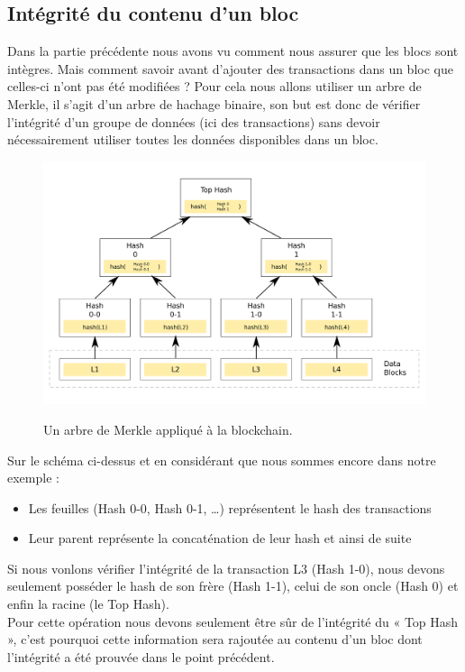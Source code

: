 \documentclass[12pt, a4paper, oneside]{book}
\begin{document}
    \subsection{Intégrité du contenu d’un bloc}

    Dans la partie précédente nous avons vu comment nous assurer que les blocs sont intègres. Mais comment savoir avant d’ajouter des transactions dans un bloc que celles-ci n’ont pas été modifiées ?
    \newline
    Pour cela nous allons utiliser un arbre de Merkle, il s’agit d’un arbre de hachage binaire, son but est donc de vérifier l’intégrité d’un groupe de données (ici des transactions) sans devoir nécessairement utiliser toutes les données disponibles dans un bloc.

    \begin{figure}[H]
        \begin{center}
          \includegraphics[width=\textwidth]{images/arbre.png}
          \label{fig:arbre}
          \caption{Un arbre de Merkle appliqué à la blockchain.}
        \end{center}
    \end{figure}

    Sur le schéma ci-dessus et en considérant que nous sommes encore dans notre exemple :

    \begin{itemize}
        \item Les feuilles (Hash 0-0, Hash 0-1, …) représentent le hash des transactions
        \item Leur parent représente la concaténation de leur hash et ainsi de suite
        \newline
    \end{itemize}
    Si nous vonlons vérifier l’intégrité de la transaction L3 (Hash 1-0), nous devons seulement posséder le hash de son frère (Hash 1-1), celui de son oncle (Hash 0) et enfin la racine (le Top Hash).
    \\
    Pour cette opération nous devons seulement être sûr de l’intégrité du « Top Hash », c’est pourquoi cette information sera rajoutée au contenu d’un bloc dont l'intégrité a été prouvée dans le point précédent.\cite{merkle}
\end{document}
